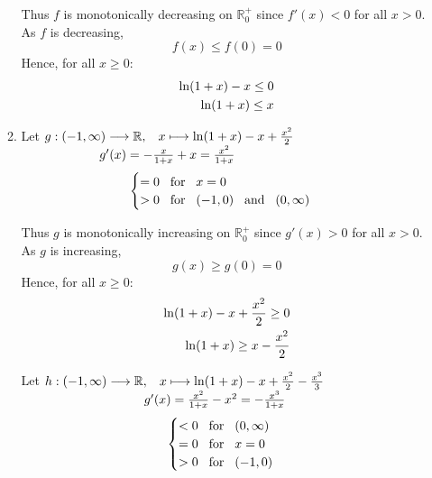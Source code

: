 \documentclass[12pt]{amsart}
\begin{document}
\begin{enumerate}
\begin{enumerate}
			Thus $f$ is monotonically decreasing on $\mathbb{R}_0^+$ since $f'(x)<0$ for all $x>0$. As 				$f$ is decreasing, %
			$$f(x) \le f(0) = 0$$
			Hence, for all $x\ge0:$
				\begin{align}
					\ln(1+x)-x \le 0 \notag \\
					\ln(1+x) \le x \notag
				\end{align}
			
			\item Let $g: (-1, \infty) \longrightarrow \mathbb{R}, \hspace{0.3cm} x \longmapsto 
			\ln(1+x)-x+\frac{x^2}{2}$ \\
			$\text{ } \hspace{2.05cm} g'(x) = -\frac{x}{1+x}+x=\frac{x^2}{1+x}$
				\begin{align}
					 \begin{cases}
						= 0 \hspace{0.3cm} \text{for} \hspace{0.3cm} x=0 \notag \\
						> 0 \hspace{0.3cm} \text{for} \hspace{0.3cm} (-1,0)  \hspace{0.3cm} \text{and} 							\hspace{0.3cm} (0,\infty) \notag
					\end{cases}
				\end{align} 
		
			Thus $g$ is monotonically increasing on $\mathbb{R}_0^+$ since $g'(x)>0$ for all $x>0$.  As 
			$g$ is increasing, %
			$$g(x) \ge g(0) = 0$$
			Hence, for all $x\ge0:$
				\begin{align}
					\ln(1+x)-x+\frac{x^2}{2} \ge 0 \notag \\
					\ln(1+x) \ge x-\frac{x^2}{2} \notag
				\end{align}
				
			Let $h: (-1, \infty) \longrightarrow \mathbb{R}, \hspace{0.3cm} x \longmapsto 
			\ln(1+x)-x+\frac{x^2}{2}-\frac{x^3}{3}$ \\
			$\text{ } \hspace{3.3cm} g'(x) = \frac{x^2}{1+x}-x^2=-\frac{x^3}{1+x}$
				\begin{align}
					 \begin{cases}
						< 0 \hspace{0.3cm} \text{for} \hspace{0.3cm} (0, \infty) \\
						= 0 \hspace{0.3cm} \text{for} \hspace{0.3cm} x=0 \notag \\
						> 0 \hspace{0.3cm} \text{for} \hspace{0.3cm} (-1,0) \notag 
					\end{cases}
				\end{align} 
		

\end{enumerate}
\end{enumerate}
\end{document}
